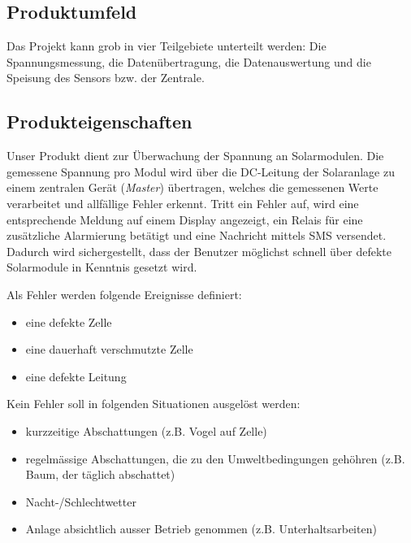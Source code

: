 \subsection{Produktumfeld}


Das   Projekt   kann  grob   in   vier   Teilgebiete  unterteilt   werden: Die
Spannungsmessung, die Daten\"ubertragung, die Datenauswertung und die Speisung
des Sensors bzw. der Zentrale.


\subsection{Produkteigenschaften}
\label{subsec:produkteigenschaften}

Unser  Produkt  dient  zur  \"Uberwachung der  Spannung  an  Solarmodulen. Die
gemessene Spannung  pro Modul  wird \"uber die  DC-Leitung der  Solaranlage zu
einem zentralen  Ger\"at (\emph{Master}) \"ubertragen, welches  die gemessenen
Werte verarbeitet und allf\"allige Fehler  erkennt. Tritt ein Fehler auf, wird
eine  entsprechende Meldung  auf  einem Display  angezeigt,  ein Relais  f\"ur
eine  zus\"atzliche  Alarmierung bet\"atigt  und  eine  Nachricht mittels  SMS
versendet. Dadurch wird  sichergestellt, dass der Benutzer m\"oglichst schnell
\"uber defekte Solarmodule in Kenntnis gesetzt wird.

Als Fehler werden folgende Ereignisse definiert:
\begin{itemize}
    \item
        eine defekte Zelle
    \item
        eine dauerhaft verschmutzte Zelle
    \item
        eine defekte Leitung
\end{itemize}

Kein Fehler soll in folgenden Situationen ausgel\"ost werden:
\begin{itemize}
    \item
        kurzzeitige Abschattungen (z.B. Vogel auf Zelle)
    \item
        regelm\"assige Abschattungen, die zu den Umweltbedingungen geh\"ohren
        (z.B. Baum, der t\"aglich abschattet)
    \item
        Nacht-/Schlechtwetter
    \item
        Anlage absichtlich ausser Betrieb genommen (z.B. Unterhaltsarbeiten)
\end{itemize}

